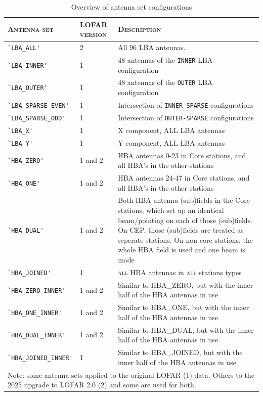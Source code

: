 \documentclass[a4paper,10pt,bibtotoc]{scrartcl}
\begin{document}
\begin{table}[ht]
  \centering
  \begin{tabular}{|llp{9cm}|}
    \hline
    \textsc{Antenna set}  & \textsc{LOFAR version} & \textsc{Description}\\
    \hline \hline
    \verb|`LBA_ALL'| & 2 &  All 96 LBA antennas. \\
    \verb|`LBA_INNER'| & 1 &  48 antennas of the \verb|INNER| LBA configuration \\
    \verb|`LBA_OUTER'| & 1 & 48 antennas of the \verb|OUTER|  LBA configuration \\
    \verb|`LBA_SPARSE_EVEN'| & 1 & Intersection of \verb|INNER-SPARSE| configurations \\
    \verb|`LBA_SPARSE_ODD'| & 1 &  Intersection of \verb|OUTER-SPARSE| configurations \\
    \verb|`LBA_X'| & 1 &   X component, ALL LBA antennas   \\
    \verb|`LBA_Y'| & 1 &   Y component, ALL LBA antennas  \\
    \verb|`HBA_ZERO'| & 1 and 2 &  HBA antennas 0-23 in Core stations, and all HBA's in the other stations \\
    \verb|`HBA_ONE'| & 1 and 2  & HBA antennas 24-47 in Core stations, and all HBA's in the other stations \\
    \verb|`HBA_DUAL'| & 1 and 2 & Both HBA antenna (sub)fields in the Core stations, which set up an identical
    beam/pointing on each of those (sub)fields. On CEP, those (sub)fields are treated as seperate stations. On non-core
    stations, the whole HBA field is used and one beam is made \\
    \verb|`HBA_JOINED'| & 1 & \textsc{all} HBA antennas in \textsc{all} stations types  \\
    \verb|`HBA_ZERO_INNER'| & 1 and 2 & Similar to HBA\_ZERO, but with the inner half of the HBA antennas in use \\
    \verb|`HBA_ONE_INNER'| & 1 and 2 & Similar to HBA\_ONE, but with the inner half of the HBA antennas in use \\
    \verb|`HBA_DUAL_INNER'| & 1  and 2 & Similar to HBA\_DUAL, but with the inner half of the HBA antennas in use \\
    \verb|`HBA_JOINED_INNER'| & 1 & Similar to HBA\_JOINED, but with the inner half of the HBA antennas in use \\
    \hline
    \multicolumn{3}{p{16cm}}{Note: {\small some antenna sets applied to the original LOFAR (1) data. Others to the 2025 upgrade to LOFAR 2.0 (2) and some are used for both.}} \\
  \end{tabular}
  \caption{Overview of antenna set configurations}
  \label{tab:antenna-set}
\end{table}
\end{document}
